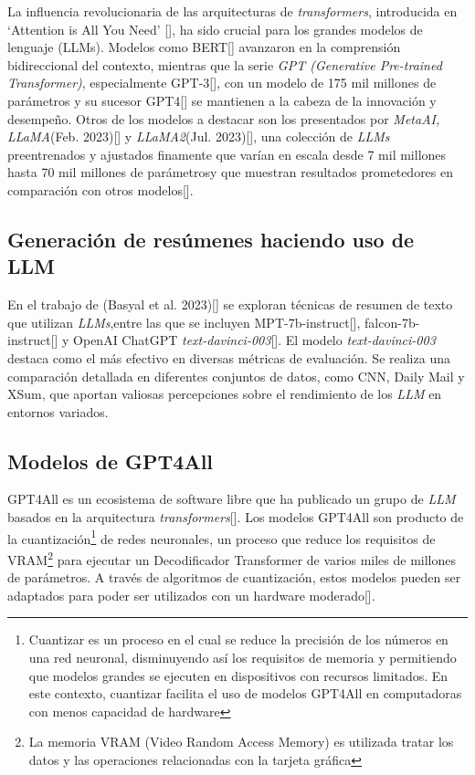     La influencia revolucionaria de las arquitecturas de \emph{transformers}, introducida en `Attention is All You Need' [\cite{attention}], ha sido crucial para los grandes modelos de lenguaje (LLMs). Modelos como BERT[\cite{BERT}] avanzaron en la comprensión bidireccional del contexto, mientras que la serie \emph{GPT (Generative Pre-trained Transformer)}, especialmente GPT-3[\cite{brown2020language}], con un modelo de 175 mil millones de parámetros y su sucesor GPT4[\cite{openai2023gpt4}] se mantienen a la cabeza de la innovación y desempeño. Otros de los modelos a destacar son los presentados por \emph{MetaAI, LLaMA}(Feb. 2023)[\cite{llamapaper}] y \emph{LLaMA2}(Jul. 2023)[\cite{llamapaper2}], una colección de \emph{LLMs} preentrenados y ajustados finamente que varían en escala desde 7 mil millones hasta 70 mil millones de parámetrosy que muestran resultados prometedores en comparación con otros modelos[\cite{metallama}]. 
    
    \subsection{Generación de resúmenes haciendo uso de LLM}

    En el trabajo de (Basyal et al. 2023)[\cite{basyal2023text}] se exploran técnicas de resumen de texto que utilizan \emph{LLMs},entre las que se incluyen MPT-7b-instruct[\cite{mpt}], falcon-7b-instruct[\cite{falcon}] y OpenAI ChatGPT \emph{text-davinci-003}[\cite{brown2020language}]. El modelo \emph{text-davinci-003} destaca como el más efectivo en diversas métricas de evaluación. Se realiza una comparación detallada en diferentes conjuntos de datos, como CNN, Daily Mail y XSum, que aportan valiosas percepciones sobre el rendimiento de los \emph{LLM} en entornos variados. 

    \subsection{Modelos de GPT4All}

        GPT4All es un ecosistema de software libre que ha publicado un grupo de \emph{LLM} basados en la arquitectura \emph{transformers}[\cite{attention}]. Los modelos GPT4All son producto de la cuantización\footnote{Cuantizar es un proceso en el cual se reduce la precisión de los números en una red neuronal, disminuyendo así los requisitos de memoria y permitiendo que modelos grandes se ejecuten en dispositivos con recursos limitados. En este contexto, cuantizar facilita el uso de modelos GPT4All en computadoras con menos capacidad de hardware} de redes neuronales, un proceso que reduce los requisitos de VRAM\footnote{La memoria VRAM (Video Random Access Memory) es utilizada tratar los datos y las operaciones relacionadas con la tarjeta gráfica} para ejecutar un Decodificador Transformer de varios miles de millones de parámetros. A través de algoritmos de cuantización, estos modelos pueden ser adaptados para poder ser utilizados con un hardware moderado[\cite{webgpt4all}].
        
